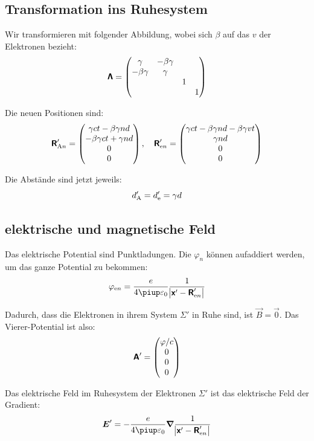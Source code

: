 \subsection{Transformation ins Ruhesystem}

Wir transformieren mit folgender Abbildung, wobei sich $\beta$ auf das $v$ der
Elektronen bezieht:
\[
	\boldsymbol{\mathsf{\Lambda}}
	=
	\begin{pmatrix}
		\gamma & -\beta\gamma & & \\
		-\beta\gamma & \gamma & & \\
									& & 1 & \\
									& & & 1
	\end{pmatrix}
\]

Die neuen Positionen sind:
\[
	\boldsymbol{\mathsf{R}}'_{\text An}
	=
	\begin{pmatrix}
		\gamma ct - \beta \gamma n d \\
		-\beta \gamma c t + \gamma n d \\
		0 \\
		0
	\end{pmatrix}
	,\quad
	\boldsymbol{\mathsf{R}}'_{\text en}
	=
	\begin{pmatrix}
		\gamma ct - \beta \gamma n d - \beta \gamma v t \\
		\gamma n d \\
		0 \\
		0
	\end{pmatrix}
\]

Die Abstände sind jetzt jeweils:
\[
	d'_{\text A} = d'_{\text e} = \gamma d
\]

\subsection{elektrische und magnetische Feld}

Das elektrische Potential sind Punktladungen. Die $\varphi_n$ können aufaddiert
werden, um das ganze Potential zu bekommen:
\[
	\varphi_{\text en}
	= \frac{e}{4\piup\varepsilon_0}
	\frac{1}{\abs{\tens x' - \tens R'_{\text en}}}
\]

Dadurch, dass die Elektronen in ihrem System $\Sigma'$ in Ruhe sind, ist $\vec
B = \vec 0$. Das Vierer-Potential ist also:
\[
	\boldsymbol{\mathsf{A}}'
	=
	\begin{pmatrix}
		\varphi / c \\ 0 \\ 0 \\ 0
	\end{pmatrix}
\]

Das elektrische Feld im Ruhesystem der Elektronen $\Sigma'$ ist das elektrische Feld der Gradient:
\[
	\vec E'
	= - \frac{e}{4\piup\varepsilon_0}
	\vnabla \frac{1}{\abs{\tens x' - \tens R'_{\text en}}}
\]

